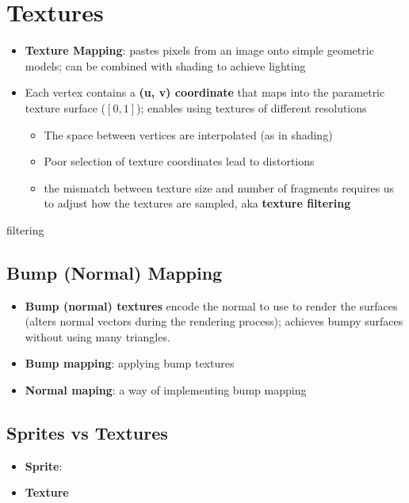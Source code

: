 \chapter{Textures}

\begin{itemize}
  \item \textbf{Texture Mapping}: pastes pixels from an image onto
  simple geometric models; can be combined with shading to achieve lighting
  \item Each vertex contains a \textbf{(u, v) coordinate} that maps into the
  parametric texture surface ($ \left[ 0, 1 \right] $); enables using
  textures of different resolutions
  \begin{itemize}
    \item The space between vertices are interpolated (as in shading)
    \item Poor selection of texture coordinates lead to distortions
    \item the mismatch between texture size and number of fragments requires us
    to adjust how the textures are sampled, aka \textbf{texture filtering}
  \end{itemize}
\end{itemize}

{filtering}

\section{Bump (Normal) Mapping}

  \begin{itemize}
    \item \textbf{Bump (normal) textures} encode the normal to use to render the
    surfaces (alters normal vectors during the rendering process);
    achieves bumpy surfaces without using many triangles.
    \item \textbf{Bump mapping}: applying bump textures
    \item \textbf{Normal maping}: a way of implementing bump mapping
  \end{itemize}


\section{Sprites vs Textures}

  \begin{itemize}
    \item \textbf{Sprite}:
    \item \textbf{Texture}
  \end{itemize}

